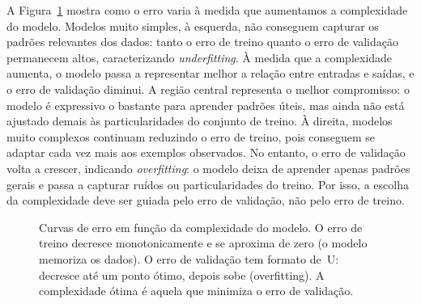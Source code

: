 \documentclass[12pt,a4paper]{article}
\begin{document}
A Figura~\ref{fig:curvas-complexidade} mostra como o erro varia à medida que aumentamos a complexidade do modelo. Modelos muito simples, à esquerda, não conseguem capturar os padrões relevantes dos dados: tanto o erro de treino quanto o erro de validação permanecem altos, caracterizando \textit{underfitting}. À medida que a complexidade aumenta, o modelo passa a representar melhor a relação entre entradas e saídas, e o erro de validação diminui. A região central representa o melhor compromisso: o modelo é expressivo o bastante para aprender padrões úteis, mas ainda não está ajustado demais às particularidades do conjunto de treino. À direita, modelos muito complexos continuam reduzindo o erro de treino, pois conseguem se adaptar cada vez mais aos exemplos observados. No entanto, o erro de validação volta a crescer, indicando \textit{overfitting}: o modelo deixa de aprender apenas padrões gerais e passa a capturar ruídos ou particularidades do treino. Por isso, a escolha da complexidade deve ser guiada pelo erro de validação, não pelo erro de treino.

\begin{figure}[ht]
\centering
{}
\caption{Curvas de erro em função da complexidade do modelo. O erro de treino decresce monotonicamente e se aproxima de zero (o modelo memoriza os dados). O erro de validação tem formato de~U: decresce até um ponto ótimo, depois sobe (overfitting). A complexidade ótima é aquela que minimiza o erro de validação.}
\label{fig:curvas-complexidade}
\end{figure}
\end{document}
